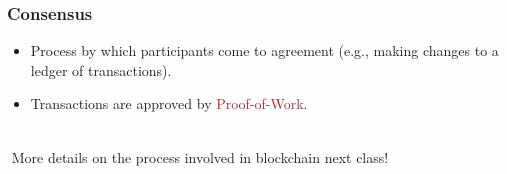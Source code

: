 \documentclass{beamer}
\begin{document}
\begin{frame}
  \frametitle{Consensus}
	\begin{itemize}
		\item Process by which participants come to agreement (e.g., making changes to a ledger of transactions).
		\item Transactions are approved by \textcolor{brown}{Proof-of-Work}.
	\end{itemize}
	 $ $ \\ $ $
	\pause
	{\huge{More details on the process involved in blockchain next class!}}
\end{frame}
\end{document}
